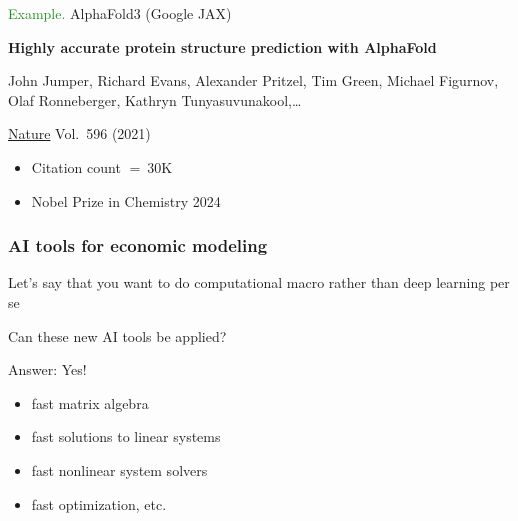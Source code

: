 \documentclass[
    xcolor={svgnames,dvipsnames},
    hyperref={colorlinks, citecolor=DeepPink4, linkcolor=DarkRed, urlcolor=DarkBlue}
    ]{beamer}  %
\newcommand{\Eg}{\textcolor{ForestGreen}{Example. }}
\newcommand{\1}{\mathbbm 1}
\begin{document}
\begin{frame}
    
    \Eg AlphaFold3 (Google JAX)

        \vspace{0.5em}
    \textbf{Highly accurate protein structure prediction with AlphaFold}

        \vspace{0.5em}
    John Jumper, Richard Evans, Alexander Pritzel, Tim Green, Michael Figurnov,
    Olaf Ronneberger, Kathryn Tunyasuvunakool,\ldots 

        \vspace{0.5em}
    \underline{Nature} Vol.\ 596 (2021)

    \vspace{0.5em}
    \vspace{0.5em}
    \vspace{0.5em}
    \vspace{0.5em}
    \begin{itemize}
        \item Citation count $= ~30$K
        \vspace{0.5em}
        \item Nobel Prize in Chemistry 2024
    \end{itemize}

\end{frame}


\begin{frame}
    \frametitle{AI tools for economic modeling}


    Let's say that you want to do computational macro rather than deep learning
    per se

    \vspace{0.5em}
    Can these new AI tools be applied?

    \pause

    \vspace{0.5em}
    \vspace{0.5em}
    Answer: Yes!

    \begin{itemize}
        \item fast matrix algebra
        \vspace{0.5em}
        \item fast solutions to linear systems
        \vspace{0.5em}
        \item fast nonlinear system solvers
        \vspace{0.5em}
        \item fast optimization, etc.
    \end{itemize}


\end{frame}
\end{document}
